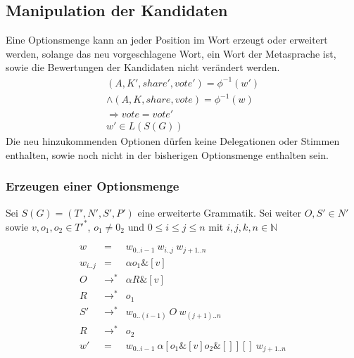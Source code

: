 \documentclass[a4paper,12pt]{report}
\begin{document}
% 
% 
% 
% 




\subsection{Manipulation der Kandidaten}
\label{manipulationkandidaten}
Eine Optionsmenge kann an jeder Position im Wort erzeugt oder erweitert werden, solange das neu vorgeschlagene Wort, ein Wort der Metasprache ist, sowie die Bewertungen der Kandidaten nicht verändert werden.
\begin{eqnarray}
(A,K',share',vote') = \phi^{-1}(w') \nonumber\\
\land (A,K,share,vote) = \phi^{-1}(w) \nonumber\\
\Rightarrow vote = vote' \\
  w'\in L(S(G))
\end{eqnarray}
Die neu hinzukommenden Optionen dürfen keine Delegationen oder Stimmen enthalten, sowie noch nicht in der bisherigen Optionsmenge enthalten sein.

\subsubsection{Erzeugen einer Optionsmenge}

Sei $S(G) = (T', N', S', P')$ eine erweiterte Grammatik. Sei weiter $O,S'\in N'$ sowie $v,o_1,o_2 \in T'^*$, $o_1\neq 0_2$ und $0\leq i\leq j\leq n$ mit $i,j,k,n \in \mathbb{N}$

\begin{eqnarray}
  w &=& w_{0 .. i-1}\ w_{i..j}\ w_{j+1 .. n} \\
  w_{i..j} &=& \alpha o_1 \& [v] \\
  O &\rightarrow^*& \alpha R \& [v] \\
  R &\rightarrow^*& o_1 \\
  S' &\rightarrow^*& w_{0 .. (i-1)}\ O\ w_{(j+1) .. n}\\
  R &\rightarrow^*& o_2 \\
  w' &=& w_{0..i-1}\ \alpha [o_1\& [v] o_2\& []][]\ w_{j+1 .. n}
\end{eqnarray}
\end{document}
